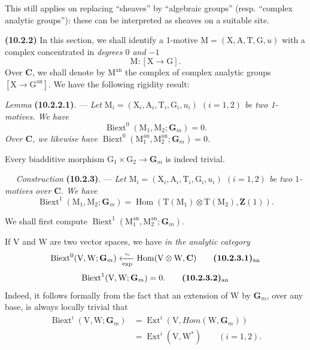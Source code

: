 \documentclass[11pt,leqno]{article}
\newcommand{\Page}[1]{\ifvmode\noindent\else\unskip\ \fi{\footnotesize\textcolor{gray}{[p.\,#1]}}\ \ignorespaces}
\begin{document}
This still applies on replacing “sheaves” by “algebraic
groups” (resp. “complex analytic groups”): these can
be interpreted as sheaves on a suitable site.

\textbf{(10.2.2)} In this section, we shall identify a 1-motive
\(\mathrm{M}=(\mathrm{X},\mathrm{A},\mathrm{T},\mathrm{G},u)\)
with a complex concentrated in \textit{degrees \(0\) and \(-1\)}
\[
\mathrm{M}:[\mathrm{X}\to\mathrm{G}].
\]
Over \(\mathbf{C}\), we shall denote by \(\mathrm{M}^{\mathrm{an}}\)
the complex of complex analytic groups
\([\mathrm{X}\to\mathrm{G}^{\mathrm{an}}]\).
We have the following rigidity result:

\textit{Lemma} \textbf{(10.2.2.1)}. —
\textit{Let
\(\mathrm{M}_i=(\mathrm{X}_i,\mathrm{A}_i,\mathrm{T}_i,\mathrm{G}_i,u_i)\)
\((i=1,2)\) be two 1-motives. We have}
\[
\operatorname{Biext}^0(\mathrm{M}_1,\mathrm{M}_2;\mathbf{G}_m)=0.
\]
\textit{Over \(\mathbf{C}\), we likewise have
\(\operatorname{Biext}^0
(\mathrm{M}_1^{\mathrm{an}},\mathrm{M}_2^{\mathrm{an}};\mathbf{G}_m)=0\).}

Every biadditive morphism
\(\mathrm{G}_1\times\mathrm{G}_2\to\mathbf{G}_m\)
is indeed trivial.

\Page{61}
\textit{Construction} \textbf{(10.2.3)}. — \textit{Let
\(\mathrm{M}_i=(\mathrm{X}_i,\mathrm{A}_i,\mathrm{T}_i,\mathrm{G}_i,u_i)\)
\((i=1,2)\) be two \(1\)-motives over \(\mathbf{C}\). We have}
\[
\operatorname{Biext}^{1}(\mathrm{M}_1,\mathrm{M}_2;\mathbf{G}_m)
=\operatorname{Hom}(\mathrm{T}(\mathrm{M}_1)\otimes
\mathrm{T}(\mathrm{M}_2),\mathbf{Z}(1)).
\]

We shall first compute
\(\operatorname{Biext}^{1}(\mathrm{M}_1^{\mathrm{an}},
\mathrm{M}_2^{\mathrm{an}};\mathbf{G}_m)\).

If \(\mathrm{V}\) and \(\mathrm{W}\) are two vector spaces, we have
\textit{in the analytic category}
\[
\operatorname{Biext}^{0}(\mathrm{V},\mathrm{W};\mathbf{G}_m)
\xleftarrow[\exp]{\sim}
\operatorname{Hom}(\mathrm{V}\otimes\mathrm{W},\mathbf{C})
\tag*{\textbf{(10.2.3.1)}\textsubscript{an}}
\]
\[
\operatorname{Biext}^{1}(\mathrm{V},\mathrm{W};\mathbf{G}_m)=0.
\tag*{\textbf{(10.2.3.2)}\textsubscript{an}}
\]
Indeed, it follows formally from the fact that an extension of
\(\mathrm{W}\) by \(\mathbf{G}_m\), over any base, is always
locally trivial that
\[
\begin{aligned}
\operatorname{Biext}^{i}(\mathrm{V},\mathrm{W};\mathbf{G}_m)
&=\operatorname{Ext}^{i}(\mathrm{V},
  \mathit{Hom}(\mathrm{W},\mathbf{G}_m))\\
&=\operatorname{Ext}^{i}(\mathrm{V},\mathrm{W}^{*})
\qquad(i=1,2).
\end{aligned}
\]
\end{document}
